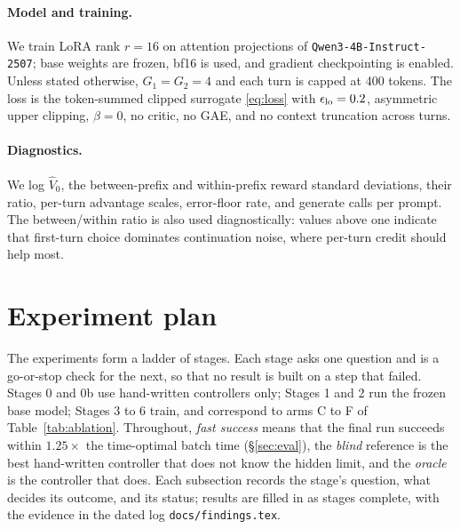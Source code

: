 \documentclass[11pt,a4paper]{article}
\begin{document}
\paragraph{Model and training.} We train LoRA rank $r=16$ on attention projections of \texttt{Qwen3-4B-Instruct-2507}; base weights are frozen, bf16 is used, and gradient checkpointing is enabled. Unless stated otherwise, $G_1=G_2=4$ and each turn is capped at 400 tokens. The loss is the token-summed clipped surrogate \eqref{eq:loss} with $\epsilon_{\rm lo}=0.2$, asymmetric upper clipping, $\beta=0$, no critic, no GAE, and no context truncation across turns.

\paragraph{Diagnostics.} We log $\widehat V_0$, the between-prefix and within-prefix reward standard deviations, their ratio, per-turn advantage scales, error-floor rate, and generate calls per prompt. The between/within ratio is also used diagnostically: values above one indicate that first-turn choice dominates continuation noise, where per-turn credit should help most.

\section{Experiment plan}
\label{sec:plan}

The experiments form a ladder of stages. Each stage asks one question and is a go-or-stop check for the next, so that no result is built on a step that failed. Stages 0 and 0b use hand-written controllers only; Stages 1 and 2 run the frozen base model; Stages 3 to 6 train, and correspond to arms C to F of Table~\ref{tab:ablation}. Throughout, \emph{fast success} means that the final run succeeds within $1.25\times$ the time-optimal batch time (\S\ref{sec:eval}), the \emph{blind} reference is the best hand-written controller that does not know the hidden limit, and the \emph{oracle} is the controller that does. Each subsection records the stage's question, what decides its outcome, and its status; results are filled in as stages complete, with the evidence in the dated log \texttt{docs/findings.tex}.
\end{document}
